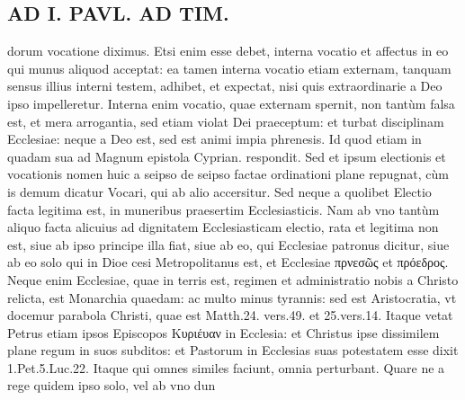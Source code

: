\documentclass{article}
\begin{document}
\begin{pages}
\section*{AD I. PAVL. AD TIM. }
\marginpar{[ p.340 ]}\pstart dorum vocatione diximus. Etsi enim esse debet, interna vocatio et affectus in eo qui munus aliquod acceptat: ea tamen interna vocatio etiam externam, tanquam sensus illius interni testem, adhibet, et expectat, nisi quis extraordinarie a Deo ipso impelleretur. Interna enim vocatio, quae externam spernit, non tantùm falsa est, et mera arrogantia, sed etiam violat Dei praeceptum: et turbat disciplinam Ecclesiae: neque a Deo est, sed est animi impia phrenesis. Id quod etiam in quadam sua ad Magnum epistola Cyprian. respondit. Sed et ipsum electionis et vocationis nomen huic a seipso de seipso factae ordinationi plane repugnat, cùm is demum dicatur Vocari, qui ab alio accersitur.  \pend\pstart Sed neque a quolibet Electio facta legitima est, in muneribus praesertim Ecclesiasticis. Nam ab vno tantùm aliquo facta alicuius ad dignitatem Ecclesiasticam electio, rata et legitima non est, siue ab ipso principe illa fiat, siue ab eo, qui Ecclesiae patronus dicitur, siue ab eo solo qui in Dioe cesi Metropolitanus est, et Ecclesiae πρνεσῶς et πρόεδρος. Neque  enim Ecclesiae, quae in terris est, regimen et administratio nobis a Christo relicta, est Monarchia quaedam: ac multo minus tyrannis: sed est Aristocratia, vt docemur parabola Christi, quae est Matth.24. vers.49. et 25.vers.14. Itaque vetat Petrus etiam ipsos Episcopos Kυριέυαν in Ecclesia: et Christus ipse dissimilem plane regum in suos subditos: et Pastorum in Ecclesias suas potestatem esse dixit 1.Pet.5.Luc.22. Itaque qui omnes similes faciunt, omnia perturbant. Quare ne a rege quidem ipso solo, vel ab vno dun\pend

\end{pages}
\end{document}
